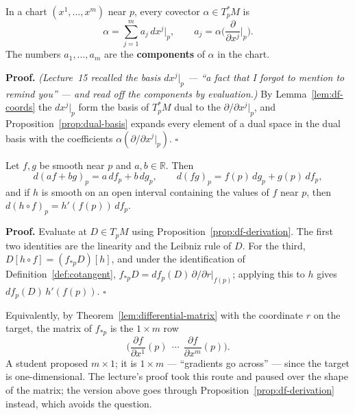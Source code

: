 \documentclass[11pt]{report}
\makeatletter
\newcounter{thmcounter}[section]
\renewenvironment{proof}[1][Proof]{\noindent\textbf{#1.} }{\hfill$\square$\par\vspace{5pt}}
\newcommand{\thmlabel}[1]{\edef\@currentlabel{\arabic{section}.\arabic{thmcounter}}\label{#1}}
\newcommand{\leeref}[1]{\par\smallskip{\raggedleft\footnotesize\textsc{Lee}:\ #1\par}}
\makeatother
\begin{document}
\begin{corbox}\thmlabel{cor:covector-components}
In a chart $(x^1, \ldots, x^m)$ near $p$, every covector $\alpha \in T_p^*M$ is
\[
\alpha = \sum_{j=1}^m a_j\, dx^j\big|_p, \qquad a_j = \alpha\Big(\frac{\partial}{\partial x^j}\Big|_p\Big) .
\]
The numbers $a_1, \ldots, a_m$ are the \textbf{components} of $\alpha$ in the chart.
\leeref{Ch.~11, \emph{Covectors}}
\end{corbox}

\begin{proof}
\textit{(Lecture~15 recalled the basis $dx^j|_p$ --- ``a fact that I forgot to mention to remind you'' --- and read off the components by evaluation.)} By Lemma~\ref{lem:df-coords} the $dx^j|_p$ form the basis of $T_p^*M$ dual to the $\partial/\partial x^j|_p$, and Proposition~\ref{prop:dual-basis} expands every element of a dual space in the dual basis with the coefficients $\alpha(\partial/\partial x^j|_p)$.
\end{proof}

\begin{corbox}\thmlabel{cor:df-properties}
Let $f, g$ be smooth near $p$ and $a, b \in \mathbb{R}$. Then
\[
d(af + bg)_p = a\,df_p + b\,dg_p, \qquad d(fg)_p = f(p)\,dg_p + g(p)\,df_p,
\]
and if $h$ is smooth on an open interval containing the values of $f$ near $p$, then $d(h \circ f)_p = h'(f(p))\,df_p$.
\leeref{Proposition 11.20}
\end{corbox}

\begin{proof}
Evaluate at $D \in T_pM$ using Proposition~\ref{prop:df-derivation}. The first two identities are the linearity and the Leibniz rule of $D$. For the third, $D[h \circ f] = (f_{*p}D)[h]$, and under the identification of Definition~\ref{def:cotangent}, $f_{*p}D = df_p(D)\,\partial/\partial r|_{f(p)}$; applying this to $h$ gives $df_p(D)\,h'(f(p))$.
\end{proof}

\begin{rembox}\label{rem:cotangent}
Equivalently, by Theorem~\ref{lem:differential-matrix} with the coordinate $r$ on the target, the matrix of $f_{*p}$ is the $1 \times m$ row
\[
\Big( \frac{\partial f}{\partial x^1}(p) \ \ \cdots \ \ \frac{\partial f}{\partial x^m}(p) \Big).
\]
A student proposed $m \times 1$; it is $1 \times m$ --- ``gradients go across'' --- since the target is one-dimensional. The lecture's proof took this route and paused over the shape of the matrix; the version above goes through Proposition~\ref{prop:df-derivation} instead, which avoids the question.
\end{rembox}
\end{document}
